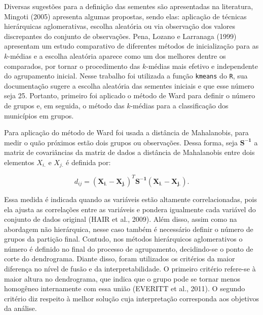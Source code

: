 \documentclass[10pt,twoside]{article}
\begin{document}
Diversas sugestões para a definição das sementes são apresentadas na literatura, Mingoti (2005) apresenta algumas propostas, sendo elas: aplicação de técnicas hierárquicas aglomerativas, escolha aleatória ou via observação dos valores discrepantes do conjunto de observações. Pena, Lozano e Larranaga (1999) apresentam um estudo comparativo de diferentes métodos de inicialização para as $k$-médias e a escolha aleatória aparece como um dos melhores dentre os comparados, por tornar o procedimento das $k$-médias mais efetivo e independente do agrupamento inicial. Nesse trabalho foi utilizada a função \texttt{kmeans} do \texttt{R}, sua documentação sugere a escolha aleatória das sementes iniciais e que esse número seja 25. Portanto, primeiro foi aplicado o método de Ward para definir o número de grupos e, em seguida, o método das $k$-médias para a classificação dos municípios em grupos. 

Para aplicação do método de Ward foi usada a distância de Mahalanobis, para medir o quão próximos estão dois grupos ou observações. Dessa forma, seja $\boldsymbol{S^{-1}}$ a matriz de covariâncias da matriz de dados a distância de Mahalanobis entre
dois elementos $X_{i.}$ e $X_{j.}$ é definida por:

\begin{equation}
d_{ij}= (\boldsymbol{X_{i.}} - \boldsymbol{X_{j.}})^{T} \boldsymbol{S^{-1}} (\boldsymbol{X_{i.}} - \boldsymbol{X_{j.}}).
\end{equation}

Essa medida é indicada quando as variáveis estão altamente correlacionadas, pois ela ajusta as correlações entre as variáveis e pondera igualmente cada variável do conjunto de dados original (HAIR et al., 2009). Além disso, assim como na abordagem não hierárquica, nesse caso também é necessário definir o número de grupos da partição final. Contudo, nos métodos hierárquicos aglomerativos o número é definido no final do processo de agrupamento, decidindo-se o ponto de corte do dendrograma. Diante disso, foram utilizados os critérios da maior diferença no nível de fusão e da interpretabilidade. O primeiro critério refere-se à maior altura no dendrograma, que indica que o grupo pode se tornar menos homogêneo internamente com essa união  (EVERITT et al., 2011). O segundo critério diz respeito à melhor solução cuja interpretação corresponda aos objetivos da análise.
\end{document}
